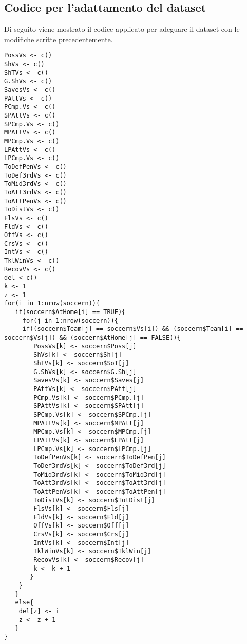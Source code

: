 \subsection{Codice per l'adattamento del dataset}
Di seguito viene mostrato il codice applicato per adeguare il dataset con le modifiche scritte precedentemente.

\begin{lstlisting}
PossVs <- c()
ShVs <- c()
ShTVs <- c()
G.ShVs <- c()
SavesVs <- c()
PAttVs <- c()
PCmp.Vs <- c()
SPAttVs <- c()
SPCmp.Vs <- c()
MPAttVs <- c()
MPCmp.Vs <- c()
LPAttVs <- c()
LPCmp.Vs <- c()
ToDefPenVs <- c()
ToDef3rdVs <- c()
ToMid3rdVs <- c()
ToAtt3rdVs <- c()
ToAttPenVs <- c()
ToDistVs <- c()
FlsVs <- c()
FldVs <- c()
OffVs <- c()
CrsVs <- c()
IntVs <- c()
TklWinVs <- c()
RecovVs <- c()
del <-c()
k <- 1
z <- 1
for(i in 1:nrow(soccern)){
   if(soccern$AtHome[i] == TRUE){
     for(j in 1:nrow(soccern)){
	 if((soccern$Team[j] == soccern$Vs[i]) && (soccern$Team[i] == soccern$Vs[j]) && (soccern$AtHome[j] == FALSE)){
		PossVs[k] <- soccern$Poss[j]
		ShVs[k] <- soccern$Sh[j]
		ShTVs[k] <- soccern$SoT[j]
		G.ShVs[k] <- soccern$G.Sh[j]
		SavesVs[k] <- soccern$Saves[j]
		PAttVs[k] <- soccern$PAtt[j]
		PCmp.Vs[k] <- soccern$PCmp.[j]
		SPAttVs[k] <- soccern$SPAtt[j]
		SPCmp.Vs[k] <- soccern$SPCmp.[j]
		MPAttVs[k] <- soccern$MPAtt[j]
		MPCmp.Vs[k] <- soccern$MPCmp.[j]
		LPAttVs[k] <- soccern$LPAtt[j]
		LPCmp.Vs[k] <- soccern$LPCmp.[j]
		ToDefPenVs[k] <- soccern$ToDefPen[j]
		ToDef3rdVs[k] <- soccern$ToDef3rd[j]
		ToMid3rdVs[k] <- soccern$ToMid3rd[j]
		ToAtt3rdVs[k] <- soccern$ToAtt3rd[j]
		ToAttPenVs[k] <- soccern$ToAttPen[j]
		ToDistVs[k] <- soccern$TotDist[j]
		FlsVs[k] <- soccern$Fls[j]
		FldVs[k] <- soccern$Fld[j]
		OffVs[k] <- soccern$Off[j]
		CrsVs[k] <- soccern$Crs[j]
		IntVs[k] <- soccern$Int[j]
		TklWinVs[k] <- soccern$TklWin[j]
		RecovVs[k] <- soccern$Recov[j]
		k <- k + 1
	   }      
	}
   }
   else{
	del[z] <- i
	z <- z + 1
   }
}
\end{lstlisting}

